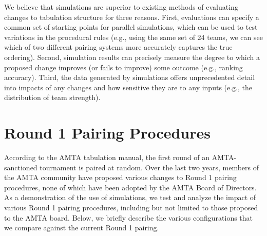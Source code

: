 \documentclass{tufte-handout}
\begin{document}
We believe that simulations are superior to existing methods of evaluating changes to tabulation structure for three reasons. First, evaluations can specify a common set of starting points for parallel simulations, which can be used to test variations in the procedural rules (e.g., using the same set of 24 teams, we can see which of two different pairing systems more accurately captures the true ordering). Second, simulation results can precisely measure the degree to which a proposed change improves (or fails to improve) some outcome (e.g., ranking accuracy). Third, the data generated by simulations offers unprecedented detail into impacts of any changes and how sensitive they are to any inputs (e.g., the distribution of team strength). 

\section{Round 1 Pairing Procedures}

According to the AMTA tabulation manual, the first round of an AMTA-sanctioned tournament is paired at random. Over the last two years, members of the AMTA community have proposed various changes to Round 1 pairing procedures, none of which have been adopted by the AMTA Board of Directors. As a demonstration of the use of simulations, we test and analyze the impact of various Round 1 pairing procedures, including but not limited to those proposed to the AMTA board. Below, we briefly describe the various configurations that we compare against the current Round 1 pairing.
\end{document}
